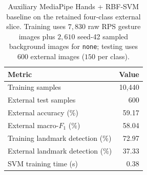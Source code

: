 \begin{table}[t]
\centering
\caption{Auxiliary MediaPipe Hands + RBF-SVM baseline on the retained
four-class external slice. Training uses $7{,}830$ raw RPS gesture
images plus $2{,}610$ seed-42 sampled background images for
\texttt{none}; testing uses $600$ external images ($150$ per class).}
\label{tab:mediapipe_svm}
\begin{tabular}{lr}
\toprule
Metric & Value \\
\midrule
Training samples & 10,440 \\
External test samples & 600 \\
External accuracy (\%) & 59.17 \\
External macro-$F_1$ (\%) & 58.04 \\
Training landmark detection (\%) & 72.97 \\
External landmark detection (\%) & 37.33 \\
SVM training time (s) & 0.38 \\
\bottomrule
\end{tabular}
\end{table}
